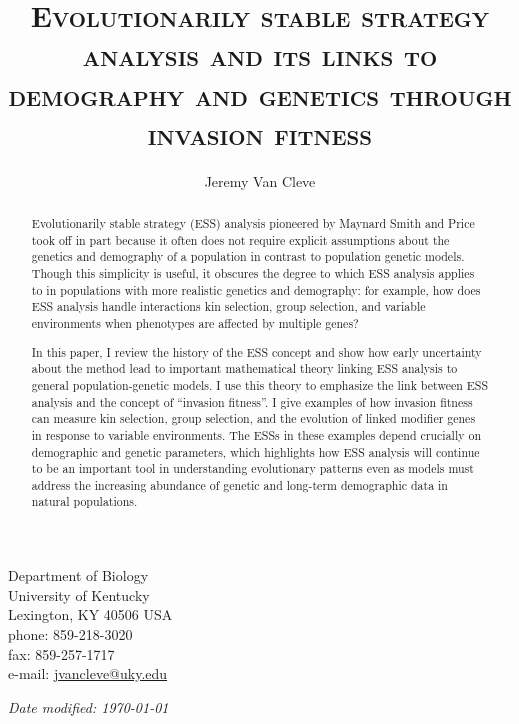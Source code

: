 \documentclass[11pt]{article}
\begin{document}
\begin{titlingpage}
\setlength{\droptitle}{2em}
\pretitle{\begin{center}\LARGE}
\posttitle{\par\end{center}\vskip 2.5em}

\title{\scshape Evolutionarily stable strategy analysis and its links to demography and genetics through invasion fitness}
\author{Jeremy Van Cleve}
\date{}
\maketitle

\vfill

\noindent
Department of Biology\\
University of Kentucky\\
Lexington, KY 40506 USA\\[1em]
phone: 859-218-3020\\
fax: 859-257-1717\\[1em]
e-mail: \href{mailto:jvancleve@uky.edu}{jvancleve@uky.edu}

\vspace{2em}

\begin{flushright} \textit{Date modified: \today} \end{flushright}
\end{titlingpage}

\linenumbers
\onehalfspacing
\begin{abstract}

  Evolutionarily stable strategy (ESS) analysis pioneered by Maynard Smith and Price took off in part because it often does not require explicit assumptions about the genetics and demography of a population in contrast to population genetic models. Though this simplicity is useful, it obscures the degree to which ESS analysis applies to in populations with more realistic genetics and demography: for example, how does ESS analysis handle interactions kin selection, group selection, and variable environments when phenotypes are affected by multiple genes?

  In this paper, I review the history of the ESS concept and show how early uncertainty about the method lead to important mathematical theory linking ESS analysis to general population-genetic models. I use this theory to emphasize the link between ESS analysis and the concept of ``invasion fitness''. I give examples of how invasion fitness can measure kin selection, group selection, and the evolution of linked modifier genes in response to variable environments. The ESSs in these examples depend crucially on demographic and genetic parameters, which highlights how ESS analysis will continue to be an important tool in understanding evolutionary patterns even as models must address the increasing abundance of genetic and long-term demographic data in natural populations.

\end{abstract}
\end{document}
